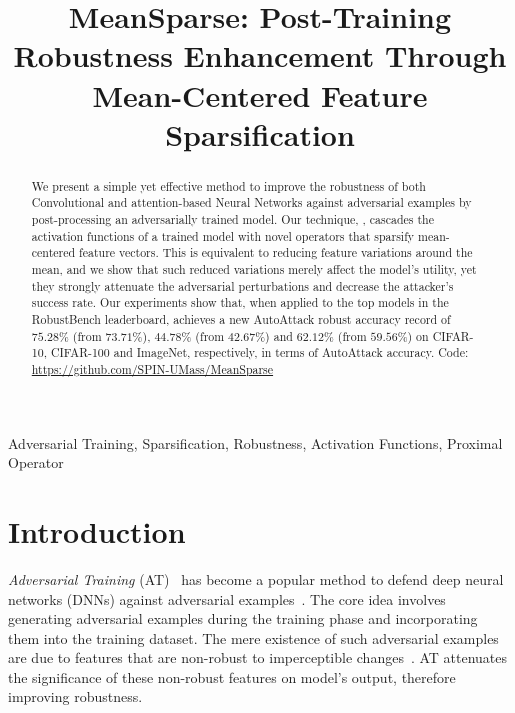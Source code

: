 \documentclass[conference]{IEEEtran}
\begin{document}
\title{MeanSparse: Post-Training Robustness Enhancement Through Mean-Centered Feature Sparsification}

\author{
}



\maketitle

\thispagestyle{plain}
\pagestyle{plain}


\begin{abstract}
We present a simple yet effective method to improve the robustness of both Convolutional and attention-based Neural Networks against adversarial examples by post-processing an adversarially trained model. 
Our technique, \sys,  cascades the activation functions of a trained model with novel operators that sparsify mean-centered feature vectors. 
This is equivalent to reducing feature variations around the mean, and we show that such reduced variations merely affect the model's utility, yet they strongly attenuate the adversarial perturbations and decrease the attacker's success rate.
Our experiments show that, when applied to the top models in the RobustBench leaderboard, \sys achieves a new AutoAttack robust accuracy record of $75.28\%$ (from $73.71\%$), $44.78\%$ (from $42.67\%$) and $62.12\%$ (from $59.56\%$) on CIFAR-10, CIFAR-100 and ImageNet, respectively, in terms of AutoAttack accuracy. 
Code: \url{https://github.com/SPIN-UMass/MeanSparse}
\end{abstract}


\begin{IEEEkeywords}
Adversarial Training, Sparsification, Robustness, Activation Functions, Proximal Operator
\end{IEEEkeywords}

\section{Introduction}
\label{sec:intro}

\emph{Adversarial Training} (AT)~\cite{tdlmm18} has become a popular method to defend deep neural networks (DNNs) against adversarial examples~\cite{iposz13, eahgs14}. The core idea involves generating adversarial examples during the training phase and incorporating them into the training dataset. The mere existence of such adversarial examples are due to  features that are non-robust to imperceptible changes~\cite{aeais19}. 
AT attenuates the significance of these non-robust features on model's output, therefore improving robustness.
\end{document}
